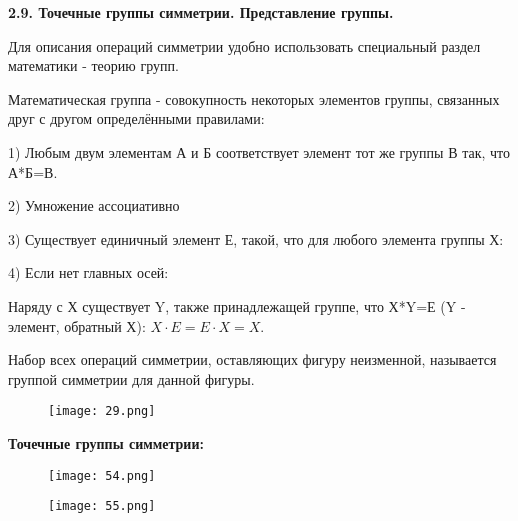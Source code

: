 
\large\textbf{2.9. Точечные группы симметрии. Представление группы.} 

\par\bigskip

Для описания операций симметрии удобно использовать
специальный раздел математики - теорию групп.

\par\smallskip

Математическая группа - совокупность некоторых элементов
группы, связанных друг с другом определёнными правилами:

\par\smallskip

1) Любым двум элементам А и Б соответствует элемент тот же
группы В так, что А*Б=В.

\par\smallskip

2) Умножение ассоциативно

\par\smallskip

3) Существует единичный элемент Е, такой, что для любого
элемента группы Х:
 
 \par\smallskip
 
4) Если нет главных осей:

 \par\smallskip
 
Наряду с Х существует Y, также принадлежащей группе, что
Х*Y=Е (Y - элемент, обратный Х): $X\cdot E = E\cdot X = X$.

  \par\smallskip
  
Набор всех операций симметрии, оставляющих фигуру
неизменной, называется группой симметрии для данной фигуры.

\begin{figure}[H]
	\centering
	{\texttt{[image: 29.png]}}
\end{figure}


\begin{center}
	\textbf{Точечные группы симметрии:}
\end{center}

\begin{figure}[H]
	\centering
	{\texttt{[image: 54.png]}}
\end{figure}

\begin{figure}[H]
	\centering
	{\texttt{[image: 55.png]}}
\end{figure}

